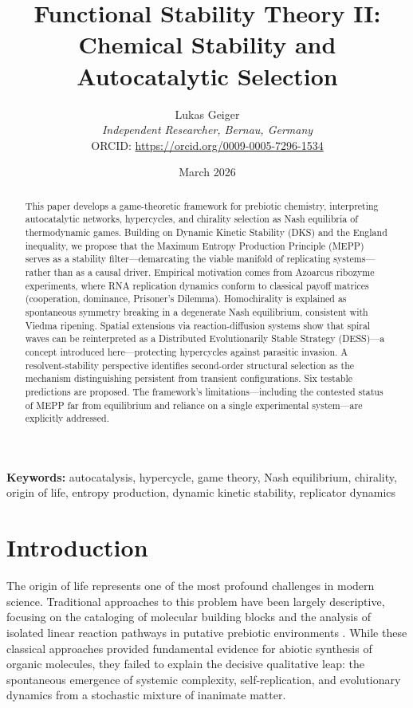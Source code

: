 \documentclass[12pt,a4paper]{article}
\title{Functional Stability Theory II: Chemical Stability and Autocatalytic Selection}
\author{Lukas Geiger\\
\textit{Independent Researcher, Bernau, Germany}\\
ORCID: \url{https://orcid.org/0009-0005-7296-1534}}
\date{March 2026}
\theoremstyle{remark}
\begin{document}
\maketitle

\begin{abstract}
This paper develops a game-theoretic framework for prebiotic chemistry, interpreting autocatalytic networks, hypercycles, and chirality selection as Nash equilibria of thermodynamic games. Building on Dynamic Kinetic Stability (DKS) and the England inequality, we propose that the Maximum Entropy Production Principle (MEPP) serves as a stability filter---demarcating the viable manifold of replicating systems---rather than as a causal driver. Empirical motivation comes from Azoarcus ribozyme experiments, where RNA replication dynamics conform to classical payoff matrices (cooperation, dominance, Prisoner's Dilemma). Homochirality is explained as spontaneous symmetry breaking in a degenerate Nash equilibrium, consistent with Viedma ripening. Spatial extensions via reaction-diffusion systems show that spiral waves can be reinterpreted as a Distributed Evolutionarily Stable Strategy (DESS)---a concept introduced here---protecting hypercycles against parasitic invasion. A resolvent-stability perspective identifies second-order structural selection as the mechanism distinguishing persistent from transient configurations. Six testable predictions are proposed. The framework's limitations---including the contested status of MEPP far from equilibrium and reliance on a single experimental system---are explicitly addressed.
\end{abstract}

\textbf{Keywords:} autocatalysis, hypercycle, game theory, Nash equilibrium, chirality, origin of life, entropy production, dynamic kinetic stability, replicator dynamics

\section{Introduction}
\label{sec:introduction}

The origin of life represents one of the most profound challenges in modern science. Traditional approaches to this problem have been largely descriptive, focusing on the cataloging of molecular building blocks and the analysis of isolated linear reaction pathways in putative prebiotic environments \citep{MillerUrey}. While these classical approaches provided fundamental evidence for abiotic synthesis of organic molecules, they failed to explain the decisive qualitative leap: the spontaneous emergence of systemic complexity, self-replication, and evolutionary dynamics from a stochastic mixture of inanimate matter.
\end{document}
